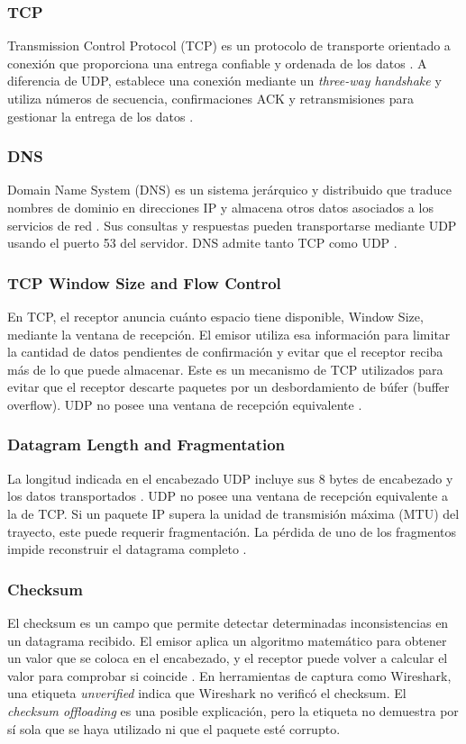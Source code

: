 \subsubsection{TCP}
Transmission Control Protocol (TCP) es un protocolo de transporte orientado a conexión que proporciona una entrega confiable y ordenada de los datos \cite{kurose2021,rfc9293}. A diferencia de UDP, establece
una conexión mediante un \textit{three-way handshake} y utiliza números
de secuencia, confirmaciones ACK y retransmisiones para gestionar la
entrega de los datos \cite{rfc9293}.

\subsubsection{DNS}
Domain Name System (DNS) es un sistema jerárquico y distribuido que traduce nombres de dominio en direcciones IP y almacena otros datos asociados a los servicios de red \cite{rfc1034}. Sus consultas y respuestas pueden transportarse mediante UDP usando el puerto 53 del servidor. DNS admite tanto TCP como UDP \cite{rfc1035}.

\subsubsection{TCP Window Size and Flow Control}
En TCP, el receptor anuncia cuánto espacio tiene disponible, Window Size, mediante la ventana de recepción. El emisor utiliza esa información para limitar la cantidad de datos pendientes de confirmación y evitar que el receptor reciba más de lo que puede almacenar. Este es un mecanismo de TCP utilizados para evitar que el receptor descarte paquetes por un desbordamiento de búfer (buffer overflow). UDP no posee una ventana de recepción equivalente \cite{rfc768,rfc9293}. 

\subsubsection{Datagram Length and Fragmentation}
La longitud indicada en el encabezado UDP incluye sus 8 bytes de encabezado y los datos transportados \cite{rfc768}. UDP no posee una ventana de recepción equivalente a la de TCP. Si un paquete IP supera la unidad de transmisión máxima (MTU) del trayecto, este puede requerir fragmentación. La pérdida de uno de los fragmentos impide reconstruir el datagrama completo  \cite{rfc8900}.

\subsubsection{Checksum}
El checksum es un campo que permite detectar determinadas inconsistencias en un datagrama recibido. El emisor aplica un algoritmo matemático para obtener un valor que se coloca en el encabezado, y el receptor puede volver a calcular el valor para comprobar si coincide \cite{rfc768,kurose2021}. En herramientas de captura como Wireshark, una etiqueta \textit{unverified} indica que Wireshark no verificó el checksum. El \textit{checksum offloading} es una posible explicación, pero la etiqueta no demuestra por sí sola que se haya utilizado ni que el paquete esté corrupto\cite{wireshark_guide}.

